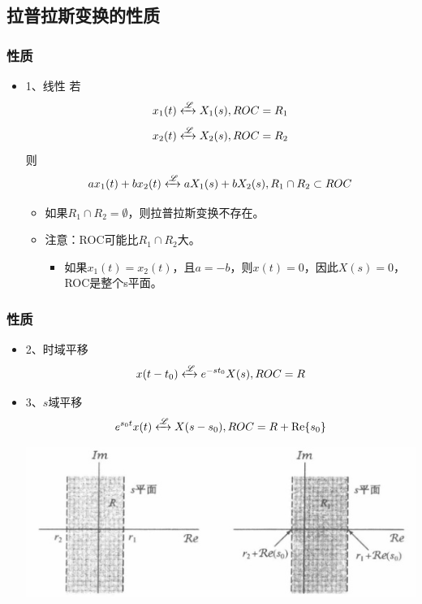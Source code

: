 \documentclass[CJKutf8,dvipsnames,table]{beamer}
\begin{document}
\begin{CJK*}{UTF8}{song}
  \section{拉普拉斯变换的性质}
  
  \begin{frame}
    \frametitle{性质}
    \begin{itemize}
    \item 1、线性
    若
    \[
    x_1(t) \xleftrightarrow{\mathscr{L}} X_1(s), ROC=R_1
    \]
    \[
    x_2(t) \xleftrightarrow{\mathscr{L}} X_2(s), ROC=R_2
    \]
    则
    \[
    ax_1(t)+bx_2(t) \xleftrightarrow{\mathscr{L}} aX_1(s)+bX_2(s), R_1 \cap R_2 \subset ROC 
    \]
    	\begin{itemize}
    	\item 如果$R_1 \cap R_2=\emptyset$，则拉普拉斯变换不存在。
   		\item 注意：ROC可能比$R_1 \cap R_2$大。
			\begin{itemize}
			\item 如果$x_1(t)=x_2(t)$，且$a=-b$，则$x(t)=0$，因此$X(s)=0$，ROC是整个s平面。
			\end{itemize}
    	\end{itemize}
    \end{itemize}
  \end{frame} 
    
  \begin{frame}
    \frametitle{性质}
    \begin{itemize}
    \item 2、时域平移 \\
    \[
    x(t-t_0) \xleftrightarrow{\mathscr{L}} e^{-st_0}X(s), ROC=R
    \]
    \item 3、$s$域平移 
    \[
    e^{s_0 t}x(t) \xleftrightarrow{\mathscr{L}} X(s-s_0), ROC=R+\operatorname{Re}\{s_0\}
    \]
    \begin{center}
      \includegraphics[scale=.5]{ss-c-f9-23}
    \end{center}
    \end{itemize}
  \end{frame}
      

\end{CJK*}
\end{document}
